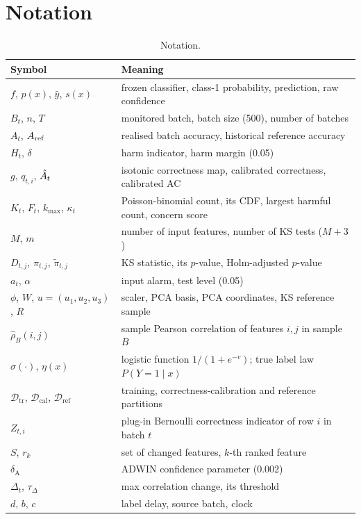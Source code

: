 \section{Notation}
\begin{table}[h]
\centering
\caption{Notation.}
\label{tab:notation}
\footnotesize
\setlength{\tabcolsep}{2pt}
\begin{tabular}{p{2.6cm}p{5.8cm}}
\toprule
Symbol & Meaning \\
\midrule
$f$, $p(x)$, $\hat y$, $s(x)$ & frozen classifier, class-1 probability, prediction, raw confidence \\
$B_t$, $n$, $T$ & monitored batch, batch size (500), number of batches \\
$A_t$, $A_{\mathrm{ref}}$ & realised batch accuracy, historical reference accuracy \\
$H_t$, $\delta$ & harm indicator, harm margin (0.05) \\
$g$, $q_{t,i}$, $\hat{A}_t$ & isotonic correctness map, calibrated correctness, calibrated AC \\
$K_t$, $F_t$, $k_{\max}$, $\kappa_t$ & Poisson-binomial count, its CDF, largest harmful count, concern score \\
$M$, $m$ & number of input features, number of KS tests ($M+3$) \\
$D_{t,j}$, $\pi_{t,j}$, $\tilde\pi_{t,j}$ & KS statistic, its $p$-value, Holm-adjusted $p$-value \\
$a_t$, $\alpha$ & input alarm, test level (0.05) \\
$\phi$, $W$, $u=(u_1,u_2,u_3)$, $R$ & scaler, PCA basis, PCA coordinates, KS reference sample \\
$\hat\rho_B(i,j)$ & sample Pearson correlation of features $i,j$ in sample $B$ \\
$\sigma(\cdot)$, $\eta(x)$ & logistic function $1/(1+e^{-v})$; true label law $P(Y{=}1\mid x)$ \\
$\mathcal{D}_{\mathrm{tr}}$, $\mathcal{D}_{\mathrm{cal}}$, $\mathcal{D}_{\mathrm{ref}}$ & training, correctness-calibration and reference partitions \\
$Z_{t,i}$ & plug-in Bernoulli correctness indicator of row $i$ in batch $t$ \\
$S$, $r_k$ & set of changed features, $k$-th ranked feature \\
$\delta_{\mathrm{A}}$ & ADWIN confidence parameter (0.002) \\
$\Delta_t$, $\tau_\Delta$ & max correlation change, its threshold \\
$d$, $b$, $c$ & label delay, source batch, clock \\
\bottomrule
\end{tabular}
\end{table}

